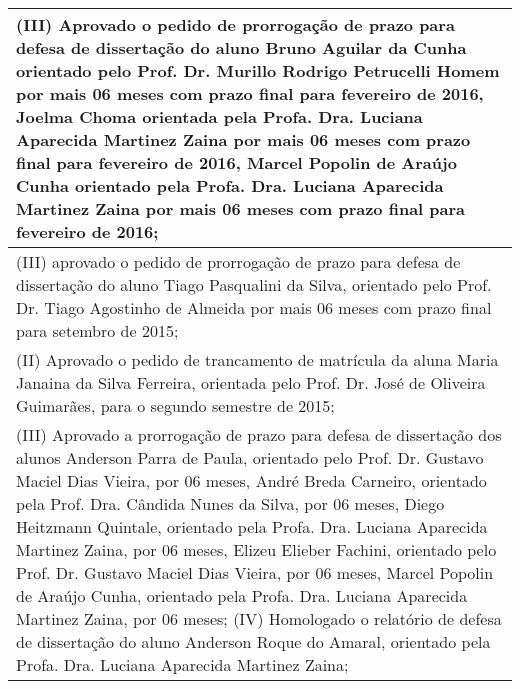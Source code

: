 
\begin{longtable}{|p{17.5cm}|}
\hline 
(III) Aprovado o pedido de prorrogação de prazo para defesa de dissertação do aluno Bruno Aguilar da Cunha orientado pelo Prof. Dr. Murillo Rodrigo Petrucelli Homem por mais 06 meses com prazo final para fevereiro de 2016, Joelma Choma orientada pela Profa. Dra. Luciana Aparecida Martinez Zaina por mais 06 meses com prazo final para fevereiro de 2016, Marcel Popolin de Araújo Cunha orientado pela Profa. Dra. Luciana Aparecida Martinez Zaina por mais 06 meses com prazo final para fevereiro de 2016;

 \\ \hline 
(III) aprovado o pedido de prorrogação de prazo para defesa de dissertação do aluno Tiago Pasqualini da Silva, orientado pelo Prof. Dr. Tiago Agostinho de Almeida por mais 06 meses com prazo final para setembro de 2015;

 \\ \hline 
(II) Aprovado o pedido de trancamento de matrícula da aluna Maria Janaina da Silva Ferreira, orientada pelo Prof. Dr. José de Oliveira Guimarães, para o segundo semestre de 2015;

 \\ \hline 
(III) Aprovado a prorrogação de prazo para defesa de dissertação dos alunos Anderson Parra de Paula, orientado pelo Prof. Dr. Gustavo Maciel Dias Vieira, por 06 meses, André Breda Carneiro, orientado pela Prof. Dra. Cândida Nunes da Silva, por 06 meses, Diego Heitzmann Quintale, orientado pela Profa. Dra. Luciana Aparecida Martinez Zaina, por 06 meses, Elizeu Elieber Fachini, orientado pelo Prof. Dr. Gustavo Maciel Dias Vieira, por 06 meses, Marcel Popolin de Araújo Cunha, orientado pela Profa. Dra. Luciana Aparecida Martinez Zaina, por 06 meses; (IV) Homologado o relatório de defesa de dissertação do aluno Anderson Roque do Amaral, orientado pela Profa. Dra. Luciana Aparecida Martinez Zaina;


\end{longtable}
